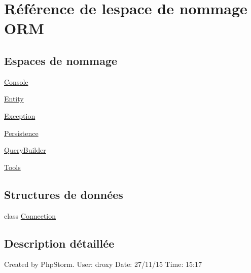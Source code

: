 \hypertarget{namespace_o_r_m}{}\section{Référence de l\textquotesingle{}espace de nommage O\+RM}
\label{namespace_o_r_m}
\subsection*{Espaces de nommage}
\begin{DoxyCompactItemize}
\item 
 \hyperlink{namespace_o_r_m_1_1_console}{Console}
\item 
 \hyperlink{namespace_o_r_m_1_1_entity}{Entity}
\item 
 \hyperlink{namespace_o_r_m_1_1_exception}{Exception}
\item 
 \hyperlink{namespace_o_r_m_1_1_persistence}{Persistence}
\item 
 \hyperlink{namespace_o_r_m_1_1_query_builder}{Query\+Builder}
\item 
 \hyperlink{namespace_o_r_m_1_1_tools}{Tools}
\end{DoxyCompactItemize}
\subsection*{Structures de données}
\begin{DoxyCompactItemize}
\item 
class \hyperlink{class_o_r_m_1_1_connection}{Connection}
\end{DoxyCompactItemize}


\subsection{Description détaillée}
Created by Php\+Storm. User\+: droxy Date\+: 27/11/15 Time\+: 15\+:17 